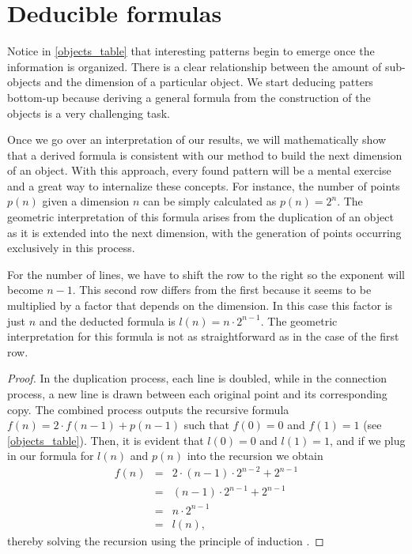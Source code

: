 \documentclass{article}
\begin{document}
	\section{Deducible formulas \label{sec:deducible}}
	
	Notice in \autoref{objects_table} that interesting patterns begin to emerge once the information is organized. There is a clear relationship between the amount of sub-objects and the dimension of a particular object. We start deducing patters bottom-up because deriving a general formula from the construction of the objects is a very challenging task.
	
	Once we go over an interpretation of our results, we will mathematically show that a derived formula is consistent with our method to build the next dimension of an object. With this approach, every found pattern will be a mental exercise and a great way to internalize these concepts. For instance, the number of points $p(n)$ given a dimension $n$ can be simply calculated as $p(n) = 2^{n}$. The geometric interpretation of this formula arises from the duplication of an object as it is extended into the next dimension, with the generation of points occurring exclusively in this process.
	
	For the number of lines, we have to shift the row to the right so the exponent will become $n-1$. This second row differs from the first because it seems to be multiplied by a factor that depends on the dimension. In this case this factor is just $n$ and the deducted formula is $l(n) = n \cdot 2^{n-1}$. The geometric interpretation for this formula is not as straightforward as in the case of the first row.
	
	\begin{proof}
		In the duplication process, each line is doubled, while in the connection process, a new line is drawn between each original point and its corresponding copy. The combined process outputs the recursive formula $f(n) = 2 \cdot f(n-1) + p(n-1)$ such that $f(0) = 0$ and $f(1) = 1$ (see \autoref{objects_table}). Then, it is evident that $l(0) = 0$ and $l(1) = 1$, and if we plug in our formula for $l(n)$ and $p(n)$ into the recursion we obtain
		\begin{eqnarray*}
			f(n) & = & 2 \cdot (n-1) \cdot 2^{n-2} + 2^{n-1}\\
			& = & (n-1) \cdot 2^{n-1} + 2^{n-1}\\
			& = & n \cdot 2^{n-1}\\
			& = & l(n),
		\end{eqnarray*}
		thereby solving the recursion using the principle of induction \cite{rosen2011discrete}.
	\end{proof}
\end{document}
